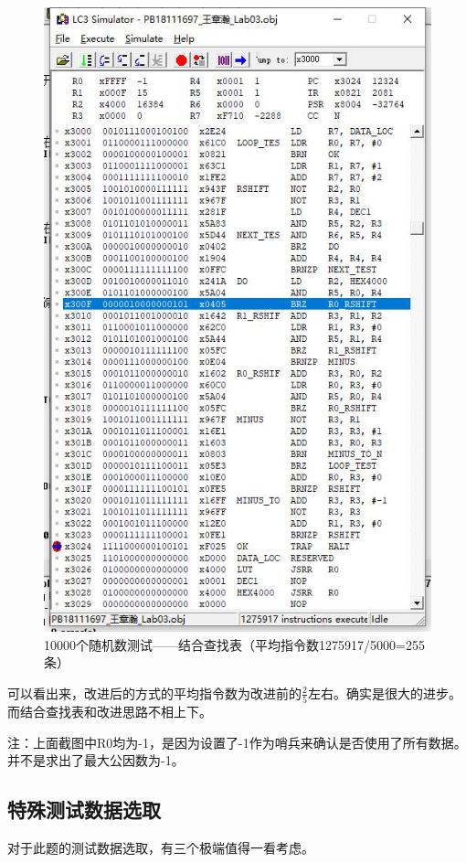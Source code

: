 \documentclass[UTF8]{article}
\begin{document}
\begin{figure}[H]
\begin{minipage}[H]{0.33\linewidth}
			\includegraphics[scale=0.33]{data0_3.jpg}
			\caption{10000个随机数测试——结合查找表（平均指令数1275917/5000=255条）}
			\label{data0_3}
		\end{minipage}
	\end{figure}
	可以看出来，改进后的方式的平均指令数为改进前的$\frac{2}{5}$左右。确实是很大的进步。而结合查找表和改进思路不相上下。\par
	注：上面截图中R0均为-1，是因为设置了-1作为哨兵来确认是否使用了所有数据。并不是求出了最大公因数为-1。\par
	
	
	\subsection{特殊测试数据选取}
	对于此题的测试数据选取，有三个极端值得一看考虑。\par
\end{document}
